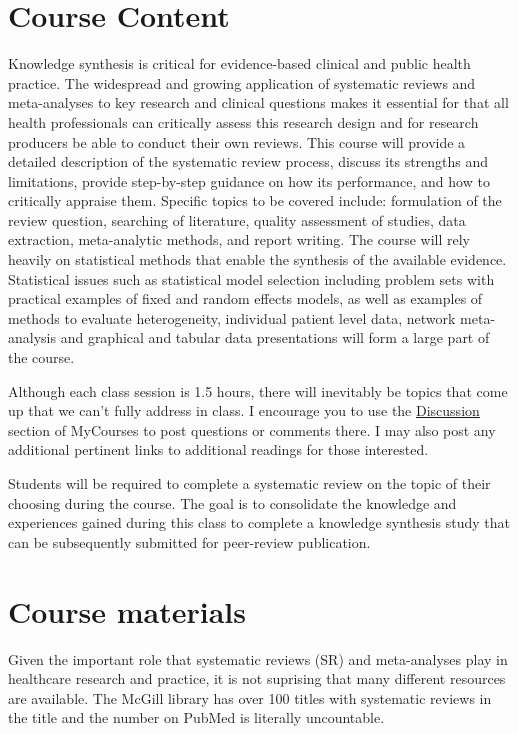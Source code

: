 \documentclass[
  letterpaper,
  DIV=11,
  numbers=noendperiod]{scrartcl}
\begin{document}
\section{Course Content}\label{course-content}

Knowledge synthesis is critical for evidence-based clinical and public
health practice. The widespread and growing application of systematic
reviews and meta-analyses to key research and clinical questions makes
it essential for that all health professionals can critically assess
this research design and for research producers be able to conduct their
own reviews. This course will provide a detailed description of the
systematic review process, discuss its strengths and limitations,
provide step-by-step guidance on how its performance, and how to
critically appraise them. Specific topics to be covered include:
formulation of the review question, searching of literature, quality
assessment of studies, data extraction, meta-analytic methods, and
report writing. The course will rely heavily on statistical methods that
enable the synthesis of the available evidence. Statistical issues such
as statistical model selection including problem sets with practical
examples of fixed and random effects models, as well as examples of
methods to evaluate heterogeneity, individual patient level data,
network meta-analysis and graphical and tabular data presentations will
form a large part of the course.~

Although each class session is 1.5 hours, there will inevitably be
topics that come up that we can't fully address in class. I encourage
you to use the
\href{https://mycourses2.mcgill.ca/d2l/le/631790/discussions/List}{Discussion}
section of MyCourses to post questions or comments there. I may also
post any additional pertinent links to additional readings for those
interested.~

Students will be required to complete a systematic review on the topic
of their choosing during the course. The goal is to consolidate the
knowledge and experiences gained during this class to complete a
knowledge synthesis study that can be subsequently submitted for
peer-review publication.~

\section{Course materials}\label{course-materials}

Given the important role that systematic reviews (SR) and meta-analyses
play in healthcare research and practice, it is not suprising that many
different resources are available. The McGill library has over 100
titles with systematic reviews in the title and the number on PubMed is
literally uncountable. ~
\end{document}
